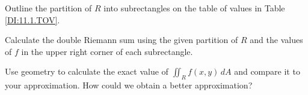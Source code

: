 \begin{activity}
    \ba
    \item Outline the partition of $R$ into subrectangles on the table of values in Table \ref{DI:11.1.TOV}.



    \item Calculate the double Riemann sum using the given partition of $R$ and the values of $f$ in the upper right corner of each subrectangle.


    \item Use geometry to calculate the exact value of $\iint_R f(x,y) \, dA$ and compare it to your approximation. How could we obtain a better approximation?



    \ea

\end{activity}
\begin{smallhint}

\end{smallhint}
\begin{bighint}

\end{bighint}
